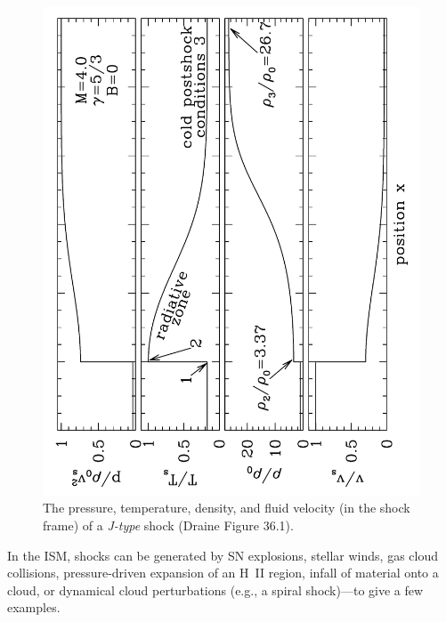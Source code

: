 \documentclass{tufte-handout}
\newcommand{\HII}{\textnormal{H{\smaller~\textsc{II}}}}
\begin{document}
\begin{figure}
\includegraphics[width=0.75\columnwidth, angle=-90]{ism_figures/Draine-36_1}
\caption{The pressure, temperature, density, and fluid velocity (in the shock frame) of a \textit{J-type} shock (Draine Figure 36.1).}
\label{fig:shocks}
\end{figure}


In the ISM, shocks can be generated by SN explosions, stellar winds, gas cloud collisions, pressure-driven expansion of an \HII{} region, infall of material onto a cloud, or dynamical cloud perturbations (e.g., a spiral shock)---to give a few examples.
\end{document}
